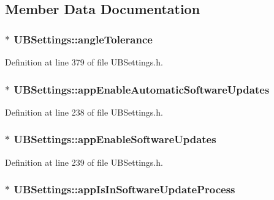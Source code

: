\subsection{Member Data Documentation}
\hypertarget{class_u_b_settings_a52ee8c0d35d5d7f767c00f27382c97e3}{
\subsubsection[{angle\-Tolerance}]{$\ast$ U\-B\-Settings\-::angle\-Tolerance}}\label{db/d66/class_u_b_settings_a52ee8c0d35d5d7f767c00f27382c97e3}


Definition at line 379 of file U\-B\-Settings.\-h.

\hypertarget{class_u_b_settings_ae222117a6ae8b801087888a673a76096}{
\subsubsection[{app\-Enable\-Automatic\-Software\-Updates}]{$\ast$ U\-B\-Settings\-::app\-Enable\-Automatic\-Software\-Updates}}\label{db/d66/class_u_b_settings_ae222117a6ae8b801087888a673a76096}


Definition at line 238 of file U\-B\-Settings.\-h.

\hypertarget{class_u_b_settings_ae6e4d32ed202fab1cf82cbb6b0d243c4}{
\subsubsection[{app\-Enable\-Software\-Updates}]{$\ast$ U\-B\-Settings\-::app\-Enable\-Software\-Updates}}\label{db/d66/class_u_b_settings_ae6e4d32ed202fab1cf82cbb6b0d243c4}


Definition at line 239 of file U\-B\-Settings.\-h.

\hypertarget{class_u_b_settings_a30feb2e7e4c453fd0ef2e4c019fc8995}{
\subsubsection[{app\-Is\-In\-Software\-Update\-Process}]{$\ast$ U\-B\-Settings\-::app\-Is\-In\-Software\-Update\-Process}}\label{db/d66/class_u_b_settings_a30feb2e7e4c453fd0ef2e4c019fc8995}


